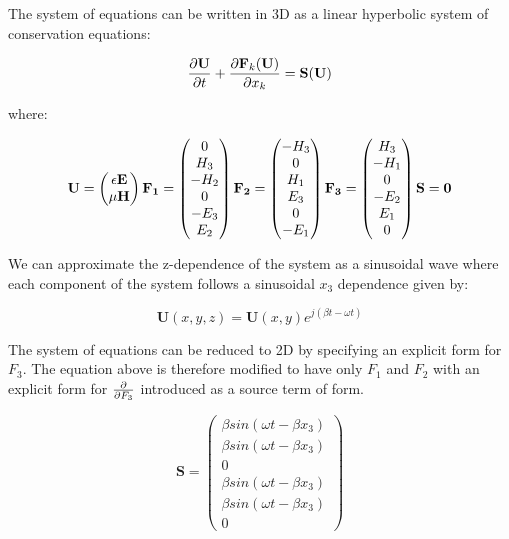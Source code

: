 The system of equations can be written in 3D as a linear hyperbolic system of conservation equations:

$$
\pder[\mathbf{U}]{t} + \pder[\mathbf{F}_k(\mathbf{U})]{x_k} = \mathbf{S}(\mathbf{U})
$$

where:

$$
\mathbf{U} = \begin{pmatrix}\epsilon \E \\ \mu \mathbf{H} \end{pmatrix}
\mathbf{F_1} = \begin{pmatrix}0 \\ H_3 \\ - H_2 \\ 0 \\ - E_3 \\ E_2 \end{pmatrix}
\mathbf{F_2} = \begin{pmatrix} -H_3 \\ 0 \\ H_1 \\ E_3 \\ 0 \\ - E_1 \end{pmatrix}
\mathbf{F_3} = \begin{pmatrix} H_3 \\ -H_1 \\ 0 \\ -E_2 \\ E_1 \\ 0 \end{pmatrix}
\mathbf{S} = \mathbf{0}
$$

We can approximate the z-dependence of the system as a sinusoidal wave where each component of the system follows a sinusoidal $x_3$ dependence given by:

$$
\mathbf{U}(x,y,z) = \mathbf{U}(x,y) e^{j(\beta t - \omega t)}
$$

The system of equations can be reduced to 2D by specifying an explicit form for $F_3$. The equation above is therefore modified to have only $F_1$ and $F_2$ with an explicit form for $\pder{F_3}$ introduced as a source term of form.

$$
\mathbf{S} = \begin{pmatrix} \beta sin(\omega t - \beta x_3) \\ \beta sin(\omega t - \beta x_3) \\ 0 \\ \beta sin(\omega t - \beta x_3) \\ \beta sin(\omega t - \beta x_3) \\ 0 \end{pmatrix}
$$

